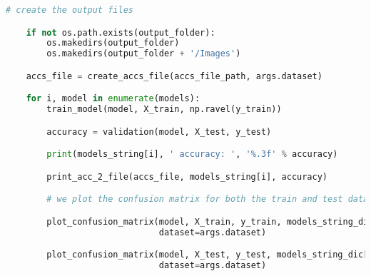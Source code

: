 \documentclass[11pt,a4paper]{article}
\begin{document}
\begin{lstlisting}[language=Python,basicstyle=\tiny]
    # create the output files

    if not os.path.exists(output_folder):
        os.makedirs(output_folder)
        os.makedirs(output_folder + '/Images')

    accs_file = create_accs_file(accs_file_path, args.dataset)

    for i, model in enumerate(models):
        train_model(model, X_train, np.ravel(y_train))

        accuracy = validation(model, X_test, y_test)

        print(models_string[i], ' accuracy: ', '%.3f' % accuracy)

        print_acc_2_file(accs_file, models_string[i], accuracy)

        # we plot the confusion matrix for both the train and test datasets

        plot_confusion_matrix(model, X_train, y_train, models_string_dic[models_string[i]], y_labels, train_flag=True,
                              dataset=args.dataset)

        plot_confusion_matrix(model, X_test, y_test, models_string_dic[models_string[i]], y_labels, train_flag=False,
                              dataset=args.dataset)
\end{lstlisting}
\end{document}
